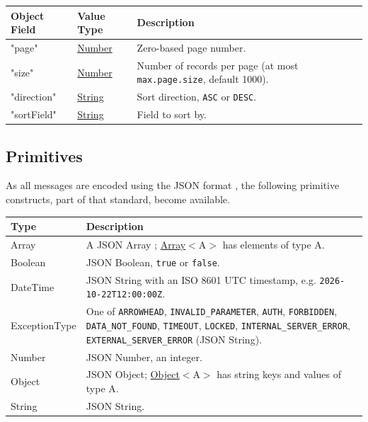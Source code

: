 \documentclass[a4paper]{arrowhead}
\newcommand{\pdef}[1]{{\textcolor{ArrowheadGrey}{#1 \label{sec:model:primitives:#1} \label{sec:model:primitives:#1s}}}}
\newcommand{\pref}[1]{{\textcolor{ArrowheadGrey}{\hyperref[sec:model:primitives:#1]{#1}}}}
\begin{document}
\noindent\begin{tabularx}{\textwidth}{| >{\raggedright\arraybackslash}p{3.9cm} | >{\raggedright\arraybackslash\small}p{5.3cm} | X |} \hline
\rowcolor{gray!33} Object Field & Value Type & Description \\ \hline
"page" & \pref{Number} & Zero-based page number. \\ \hline
"size" & \pref{Number} & Number of records per page (at most \texttt{max.\allowbreak{}page.\allowbreak{}size}, default 1000). \\ \hline
"direction" & \pref{String} & Sort direction, \texttt{ASC} or \texttt{DESC}. \\ \hline
"sort\allowbreak{}Field" & \pref{String} & Field to sort by. \\ \hline
\end{tabularx}



\subsection{Primitives}
\label{sec:model:primitives}

As all messages are encoded using the JSON format \cite{rfc8259}, the following primitive constructs, part of that standard, become available.

\noindent\begin{tabularx}{\textwidth}{| p{4.6cm} | X |} \hline
\rowcolor{gray!33} Type & Description \\ \hline
\pdef{Array} & A JSON Array \cite{rfc8259}; \pref{Array}$<$A$>$ has elements of type A. \\ \hline
\pdef{Boolean} & JSON Boolean, \texttt{true} or \texttt{false}. \\ \hline
\pdef{DateTime} & JSON String with an ISO 8601 UTC timestamp, e.g. \texttt{2026-10-22T12:00:00Z}. \\ \hline
\pdef{ExceptionType} & One of \texttt{ARROWHEAD}, \texttt{INVALID\_\allowbreak{}PARAMETER}, \texttt{AUTH}, \texttt{FORBIDDEN}, \texttt{DATA\_\allowbreak{}NOT\_\allowbreak{}FOUND}, \texttt{TIMEOUT}, \texttt{LOCKED}, \texttt{INTERNAL\_\allowbreak{}SERVER\_\allowbreak{}ERROR}, \texttt{EXTERNAL\_\allowbreak{}SERVER\_\allowbreak{}ERROR} (JSON String). \\ \hline
\pdef{Number} & JSON Number, an integer. \\ \hline
\pdef{Object} & JSON Object; \pref{Object}$<$A$>$ has string keys and values of type A. \\ \hline
\pdef{String} & JSON String. \\ \hline
\end{tabularx}
\end{document}
